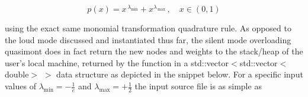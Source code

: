 \documentclass[a4paper, twosided]{book}
\begin{document}
\begin{equation*}
    p(x) = x^{\,\lambda_{\text{min}}} + x^{\lambda_{\,\text{max}}}\,,\quad x\in(0,1)
\end{equation*}

\noindent
using the exact same monomial transformation quadrature rule. As opposed to the loud mode discussed and instantiated thus far, the silent mode overloading \colorbox{poliGrayBlue}{quasimont} does in fact return the new nodes and weights to the stack/heap of the user's local machine, returned by the function in a \colorbox{poliGrayBlue}{std::vector$<$std::vector$<$double$>$ $>$} data structure as depicted in the snippet below. For a specific input values of $\lambda_{\text{min}} = -\frac{1}{e}$ and $\lambda_{\text{max}} = +\frac{1}{2}$ the input source file is as simple as

\vspace{0.2cm}
\vspace{0.3cm}
\end{document}

